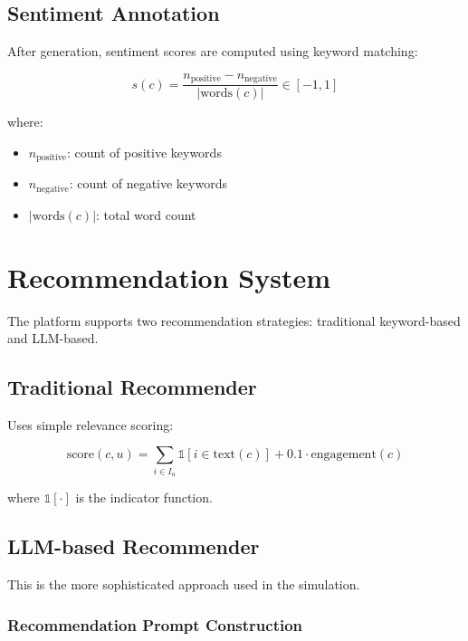 \documentclass[11pt]{article}
\begin{document}
\subsection{Sentiment Annotation}

After generation, sentiment scores are computed using keyword matching:

\begin{equation}
s(c) = \frac{n_{\text{positive}} - n_{\text{negative}}}{|\text{words}(c)|} \in [-1, 1]
\end{equation}

where:
\begin{itemize}
    \item $n_{\text{positive}}$: count of positive keywords
    \item $n_{\text{negative}}$: count of negative keywords
    \item $|\text{words}(c)|$: total word count
\end{itemize}

\section{Recommendation System}

The platform supports two recommendation strategies: traditional keyword-based and LLM-based.

\subsection{Traditional Recommender}

Uses simple relevance scoring:

\begin{equation}
\text{score}(c, u) = \sum_{i \in I_u} \mathbb{1}[i \in \text{text}(c)] + 0.1 \cdot \text{engagement}(c)
\end{equation}

where $\mathbb{1}[\cdot]$ is the indicator function.

\subsection{LLM-based Recommender}

This is the more sophisticated approach used in the simulation.

\subsubsection{Recommendation Prompt Construction}
\end{document}
